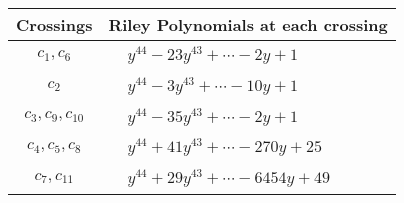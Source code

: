 \documentclass[1p]{elsarticle_modified}
\theoremstyle{definition}
\begin{document}
\begin{tabular}{m{50pt}|m{274pt}}
Crossings & \hspace{64pt}Riley Polynomials at each crossing \\
\hline $$\begin{aligned}c_{1},c_{6}\end{aligned}$$&$\begin{aligned}
&y^{44}-23 y^{43}+\cdots-2 y+1
\end{aligned}$\\
\hline $$\begin{aligned}c_{2}\end{aligned}$$&$\begin{aligned}
&y^{44}-3 y^{43}+\cdots-10 y+1
\end{aligned}$\\
\hline $$\begin{aligned}c_{3},c_{9},c_{10}\end{aligned}$$&$\begin{aligned}
&y^{44}-35 y^{43}+\cdots-2 y+1
\end{aligned}$\\
\hline $$\begin{aligned}c_{4},c_{5},c_{8}\end{aligned}$$&$\begin{aligned}
&y^{44}+41 y^{43}+\cdots-270 y+25
\end{aligned}$\\
\hline $$\begin{aligned}c_{7},c_{11}\end{aligned}$$&$\begin{aligned}
&y^{44}+29 y^{43}+\cdots-6454 y+49
\end{aligned}$\\
\hline
\end{tabular}
\vskip 2pc
\end{document}
